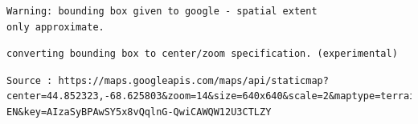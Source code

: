 \documentclass[]{krantz}
\makeatletter
\newenvironment{Shaded}{\begin{snugshade}}{\end{snugshade}}
\newcommand{\KeywordTok}[1]{\textcolor[rgb]{0.27,0.27,0.27}{\textbf{#1}}}
\newcommand{\DataTypeTok}[1]{\textcolor[rgb]{0.27,0.27,0.27}{#1}}
\newcommand{\DecValTok}[1]{\textcolor[rgb]{0.06,0.06,0.06}{#1}}
\newcommand{\StringTok}[1]{\textcolor[rgb]{0.5,0.5,0.5}{#1}}
\newcommand{\OperatorTok}[1]{\textcolor[rgb]{0.43,0.43,0.43}{\textbf{#1}}}
\newcommand{\ErrorTok}[1]{\textcolor[rgb]{0.14,0.14,0.14}{\textbf{#1}}}
\newcommand{\NormalTok}[1]{#1}
\newenvironment{kframe}{%
\medskip{}
\setlength{\fboxsep}{.8em}
 \def\at@end@of@kframe{}%
 \ifinner\ifhmode%
  \def\at@end@of@kframe{\end{minipage}}%
  \begin{minipage}{\columnwidth}%
 \fi\fi%
 \def\FrameCommand##1{\hskip\@totalleftmargin \hskip-\fboxsep
 \colorbox{shadecolor}{##1}\hskip-\fboxsep
     \hskip-\linewidth \hskip-\@totalleftmargin \hskip\columnwidth}%
 \MakeFramed {\advance\hsize-\width
   \@totalleftmargin\z@ \linewidth\hsize
   \@setminipage}}%
 {\par\unskip\endMakeFramed%
 \at@end@of@kframe}
\renewenvironment{Shaded}{\begin{kframe}}{\end{kframe}}
\theoremstyle{definition}
\theoremstyle{definition}
\theoremstyle{definition}
\theoremstyle{remark}
\makeatother
\begin{document}
\begin{Shaded}
\end{Shaded}

\begin{verbatim}
Warning: bounding box given to google - spatial extent
only approximate.
\end{verbatim}

\begin{verbatim}
converting bounding box to center/zoom specification. (experimental)
\end{verbatim}

\begin{verbatim}
Source : https://maps.googleapis.com/maps/api/staticmap?center=44.852323,-68.625803&zoom=14&size=640x640&scale=2&maptype=terrain&language=en-EN&key=AIzaSyBPAwSY5x8vQqlnG-QwiCAWQW12U3CTLZY
\end{verbatim}
\end{document}
